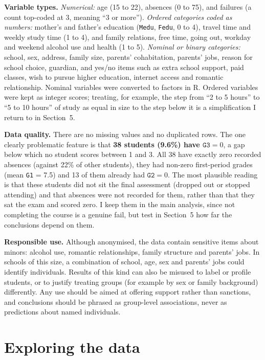\documentclass[11pt,a4paper]{article}
\begin{document}
\textbf{Variable types.} \emph{Numerical:} age (15 to 22), absences (0 to 75), and failures (a count top-coded at 3, meaning ``3 or more''). \emph{Ordered categories coded as numbers:} mother's and father's education (\texttt{Medu}, \texttt{Fedu}, 0 to 4), travel time and weekly study time (1 to 4), and family relations, free time, going out, workday and weekend alcohol use and health (1 to 5). \emph{Nominal or binary categories:} school, sex, address, family size, parents' cohabitation, parents' jobs, reason for school choice, guardian, and yes/no items such as extra school support, paid classes, wish to pursue higher education, internet access and romantic relationship. Nominal variables were converted to factors in R. Ordered variables were kept as integer scores; treating, for example, the step from ``2 to 5 hours'' to ``5 to 10 hours'' of study as equal in size to the step below it is a simplification I return to in Section~5.

\textbf{Data quality.} There are no missing values and no duplicated rows. The one clearly problematic feature is that \textbf{38 students (9.6\%) have $\texttt{G3}=0$}, a gap below which no student scores between 1 and 3. All 38 have exactly zero recorded absences (against 22\% of other students), they had non-zero first-period grades (mean \texttt{G1} = 7.5) and 13 of them already had $\texttt{G2}=0$. The most plausible reading is that these students did not sit the final assessment (dropped out or stopped attending) and that absences were not recorded for them, rather than that they sat the exam and scored zero. I keep them in the main analysis, since not completing the course is a genuine fail, but test in Section~5 how far the conclusions depend on them.

\textbf{Responsible use.} Although anonymised, the data contain sensitive items about minors: alcohol use, romantic relationships, family structure and parents' jobs. In schools of this size, a combination of school, age, sex and parents' jobs could identify individuals. Results of this kind can also be misused to label or profile students, or to justify treating groups (for example by sex or family background) differently. Any use should be aimed at offering support rather than sanctions, and conclusions should be phrased as group-level associations, never as predictions about named individuals.

\section{Exploring the data}
\end{document}
